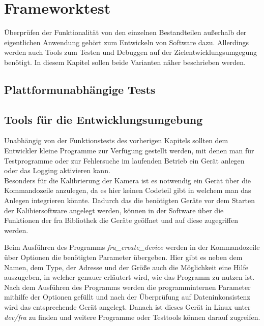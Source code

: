 \chapter{Frameworktest} \label{sec:test}
Überprüfen der Funktionalität von den einzelnen Bestandteilen außerhalb der eigentlichen Anwendung gehört zum Entwickeln von Software dazu. %
Allerdings werden auch Tools zum Testen und Debuggen auf der Zielentwicklungsumgegung benötigt. 
In diesem Kapitel sollen beide Varianten näher beschrieben werden.

\section{Plattformunabhängige Tests}


\section{Tools für die Entwicklungsumgebung}
Unabhängig von der Funktionstests des vorherigen Kapitels sollten dem Entwickler kleine Programme zur Verfügung gestellt werden, mit denen man für Testprogramme oder zur Fehlersuche im laufenden Betrieb ein Gerät anlegen oder das Logging aktivieren kann.\\


Besonders für die Kalibrierung der Kamera ist es notwendig ein Gerät über die Kommandozeile anzulegen, da es hier keinen Codeteil gibt in welchem man das Anlegen integrieren könnte. Dadurch das die benötigten Geräte vor dem Starten der Kalibiersoftware angelegt werden, können in der Software über die Funktionen der \ac{fra} Bibliothek die Geräte geöffnet und auf diese zugegriffen werden.


Beim Ausführen des Programms \textit{fra\_create\_device} werden in der Kommandozeile über Optionen die benötigten Parameter übergeben. Hier gibt es neben dem Namen, dem Type, der Adresse und der Größe auch die Möglichkeit eine Hilfe auszugeben, in welcher genauer erläutert wird, wie das Programm zu nutzen ist. 
Nach dem Ausführen des Programms werden die programminternen Parameter mithilfe der Optionen gefüllt und nach der Überprüfung auf Dateninkonsistenz wird das entsprechende Gerät angelegt. 
Danach ist dieses Gerät in Linux unter \textit{dev/fra} zu finden und weitere Programme oder Testtools können darauf zugreifen.\\

